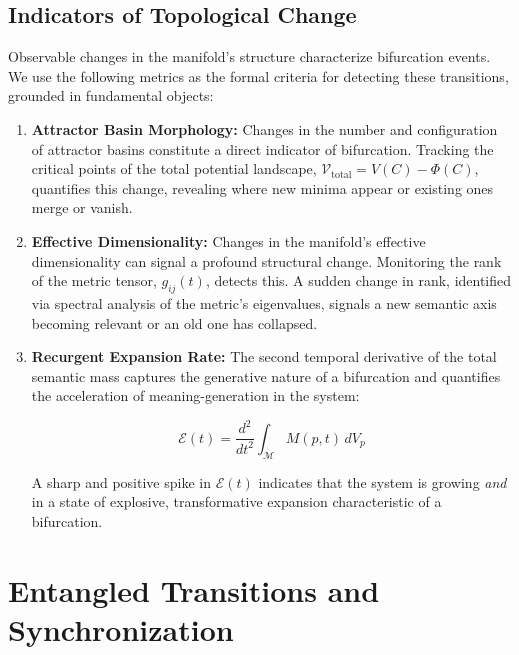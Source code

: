 \subsection{Indicators of Topological Change}
\label{sec:indicators_of_topological_change}

Observable changes in the manifold's structure characterize bifurcation events. We use the following metrics as the formal criteria for detecting these transitions, grounded in fundamental objects:

\begin{enumerate}

    \item \textbf{Attractor Basin Morphology:} Changes in the number and configuration of attractor basins constitute a direct indicator of bifurcation. Tracking the critical points of the total potential landscape, \(\mathcal{V}_{\text{total}} = V(C) - \Phi(C)\), quantifies this change, revealing where new minima appear or existing ones merge or vanish.
    
    \item \textbf{Effective Dimensionality:} Changes in the manifold's effective dimensionality can signal a profound structural change. Monitoring the rank of the metric tensor, \(g_{ij}(t)\), detects this. A sudden change in rank, identified via spectral analysis of the metric's eigenvalues, signals a new semantic axis becoming relevant or an old one has collapsed.
    
    \item \textbf{Recurgent Expansion Rate:} The second temporal derivative of the total semantic mass captures the generative nature of a bifurcation and quantifies the acceleration of meaning-generation in the system:

    \begin{equation}
    \mathcal{E}(t) = \frac{d^2}{dt^2}\int_{\mathcal{M}} M(p,t) \, dV_p
    \end{equation} 
    
    A sharp and positive spike in \(\mathcal{E}(t)\) indicates that the system is growing \textit{and} in a state of explosive, transformative expansion characteristic of a bifurcation.
    
\end{enumerate}


\section{Entangled Transitions and Synchronization}
\label{sec:entangled_transitions_and_synchronization}

